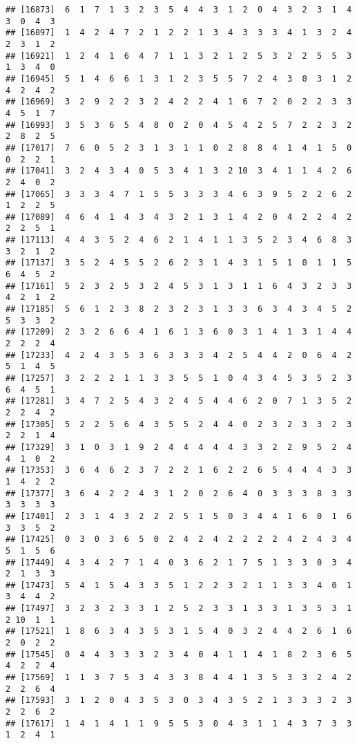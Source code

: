 \documentclass[
]{article}
\begin{document}
\begin{verbatim}
## [16873]  6  1  7  1  3  2  3  5  4  4  3  1  2  0  4  3  2  3  1  4  3  0  4  3
## [16897]  1  4  2  4  7  2  1  2  2  1  3  4  3  3  3  4  1  3  2  4  2  3  1  2
## [16921]  1  2  4  1  6  4  7  1  1  3  2  1  2  5  3  2  2  5  5  3  1  3  4  0
## [16945]  5  1  4  6  6  1  3  1  2  3  5  5  7  2  4  3  0  3  1  2  4  2  4  2
## [16969]  3  2  9  2  2  3  2  4  2  2  4  1  6  7  2  0  2  2  3  3  4  5  1  7
## [16993]  3  5  3  6  5  4  8  0  2  0  4  5  4  2  5  7  2  2  3  2  2  8  2  5
## [17017]  7  6  0  5  2  3  1  3  1  1  0  2  8  8  4  1  4  1  5  0  0  2  2  1
## [17041]  3  2  4  3  4  0  5  3  4  1  3  2 10  3  4  1  1  4  2  6  2  4  0  2
## [17065]  3  3  3  4  7  1  5  5  3  3  3  4  6  3  9  5  2  2  6  2  1  2  2  5
## [17089]  4  6  4  1  4  3  4  3  2  1  3  1  4  2  0  4  2  2  4  2  2  2  5  1
## [17113]  4  4  3  5  2  4  6  2  1  4  1  1  3  5  2  3  4  6  8  3  3  2  1  2
## [17137]  3  5  2  4  5  5  2  6  2  3  1  4  3  1  5  1  0  1  1  5  6  4  5  2
## [17161]  5  2  3  2  5  3  2  4  5  3  1  3  1  1  6  4  3  2  3  3  4  2  1  2
## [17185]  5  6  1  2  3  8  2  3  2  3  1  3  3  6  3  4  3  4  5  2  5  3  3  2
## [17209]  2  3  2  6  6  4  1  6  1  3  6  0  3  1  4  1  3  1  4  4  2  2  2  4
## [17233]  4  2  4  3  5  3  6  3  3  3  4  2  5  4  4  2  0  6  4  2  5  1  4  5
## [17257]  3  2  2  2  1  1  3  3  5  5  1  0  4  3  4  5  3  5  2  3  6  4  5  1
## [17281]  3  4  7  2  5  4  3  2  4  5  4  4  6  2  0  7  1  3  5  2  2  2  4  2
## [17305]  5  2  2  5  6  4  3  5  5  2  4  4  0  2  3  2  3  3  2  3  2  2  1  4
## [17329]  3  1  0  3  1  9  2  4  4  4  4  4  3  3  2  2  9  5  2  4  4  1  0  2
## [17353]  3  6  4  6  2  3  7  2  2  1  6  2  2  6  5  4  4  4  3  3  1  4  2  2
## [17377]  3  6  4  2  2  4  3  1  2  0  2  6  4  0  3  3  3  8  3  3  3  3  3  3
## [17401]  2  3  1  4  3  2  2  2  5  1  5  0  3  4  4  1  6  0  1  6  3  3  5  2
## [17425]  0  3  0  3  6  5  0  2  4  2  4  2  2  2  2  4  2  4  3  4  5  1  5  6
## [17449]  4  3  4  2  7  1  4  0  3  6  2  1  7  5  1  3  3  0  3  4  2  1  3  3
## [17473]  5  4  1  5  4  3  3  5  1  2  2  3  2  1  1  3  3  4  0  1  3  4  4  2
## [17497]  3  2  3  2  3  3  1  2  5  2  3  3  1  3  3  1  3  5  3  1  2 10  1  1
## [17521]  1  8  6  3  4  3  5  3  1  5  4  0  3  2  4  4  2  6  1  6  2  0  2  2
## [17545]  0  4  4  3  3  3  2  3  4  0  4  1  1  4  1  8  2  3  6  5  4  2  2  4
## [17569]  1  1  3  7  5  3  4  3  3  8  4  4  1  3  5  3  3  2  4  2  2  2  6  4
## [17593]  3  1  2  0  4  3  5  3  0  3  4  3  5  2  1  3  3  3  2  3  2  2  6  2
## [17617]  1  4  1  4  1  1  9  5  5  3  0  4  3  1  1  4  3  7  3  3  1  2  4  1

\end{verbatim}
\end{document}
